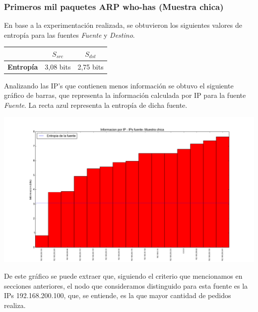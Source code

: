 \subsubsection{Primeros mil paquetes ARP who-has (Muestra chica)}

\indent \indent En base a la experimentación realizada, se obtuvieron los siguientes valores de entropía para las fuentes \textit{Fuente} y \textit{Destino}.\\

\begin{center}
	\begin{tabular}{ | c | c | c |} \hline
	   & \textbf{$S_{src}$} & \textbf{$S_{dst}$} \\ \hline
	  	\textbf{Entropía} & 3,08 bits & 2,75 bits\\ \hline
	\end{tabular}
\end{center}

\indent \indent Analizando las IP's que contienen menos información se obtuvo el siguiente gráfico de barras, que representa la información calculada por IP para la fuente \textit{Fuente}. La recta azul representa la entropía de dicha fuente.\\

\begin{center}
\includegraphics[scale=0.5,clip=true,trim=100 0 0 0]{graphics/laburo_chica_src.png}
\end{center}
\indent De este gráfico se puede extraer que, siguiendo el criterio que mencionamos en secciones anteriores, el nodo que consideramos distinguido para esta fuente es la IPs 192.168.200.100, que, se entiende, es la que mayor cantidad de pedidos realiza.


